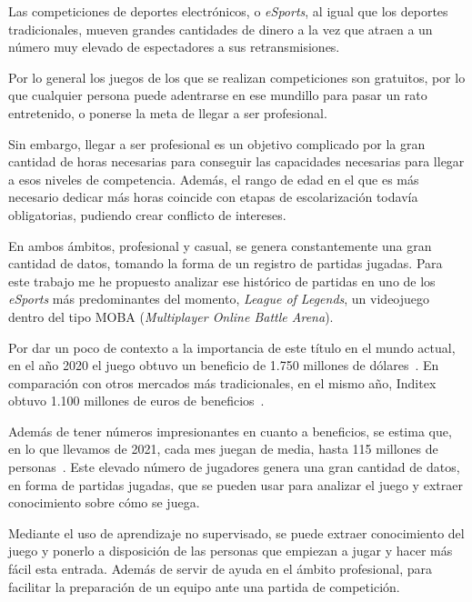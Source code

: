 
Las competiciones de deportes electrónicos, o \textit{eSports}, al igual que los deportes tradicionales, mueven grandes cantidades de dinero a la vez que atraen a un número muy elevado de espectadores a sus retransmisiones.

Por lo general los juegos de los que se realizan competiciones son gratuitos, por lo que cualquier persona puede adentrarse en ese mundillo para pasar un rato entretenido, o ponerse la meta de llegar a ser profesional.

Sin embargo, llegar a ser profesional es un objetivo complicado por la gran cantidad de horas necesarias para conseguir las capacidades necesarias para llegar a esos niveles de competencia. Además, el rango de edad en el que es más necesario dedicar más horas coincide con etapas de escolarización todavía obligatorias, pudiendo crear conflicto de intereses.

En ambos ámbitos, profesional y casual, se genera constantemente una gran cantidad de datos, tomando la forma de un registro de partidas jugadas. Para este trabajo me he propuesto analizar ese histórico de partidas en uno de los \textit{eSports} más predominantes del momento, \textit{League of Legends}, un videojuego dentro del tipo MOBA (\textit{Multiplayer Online Battle Arena}).

Por dar un poco de contexto a la importancia de este título en el mundo actual, en el año 2020 el juego obtuvo un beneficio de 1.750 millones de dólares~\cite{michael_2021}. En comparación con otros mercados más tradicionales, en el mismo año, Inditex obtuvo 1.100 millones de euros de beneficios~\cite{cortizo_2021}.

Además de tener números impresionantes en cuanto a beneficios, se estima que, en lo que llevamos de 2021, cada mes juegan de media, hasta 115 millones de personas~\cite{lol_players}. Este elevado número de jugadores genera una gran cantidad de datos, en forma de partidas jugadas, que se pueden usar para analizar el juego y extraer conocimiento sobre cómo se juega.

Mediante el uso de aprendizaje no supervisado, se puede extraer conocimiento del juego y ponerlo a disposición de las personas que empiezan a jugar y hacer más fácil esta entrada. Además de servir de ayuda en el ámbito profesional, para facilitar la preparación de un equipo ante una partida de competición.

